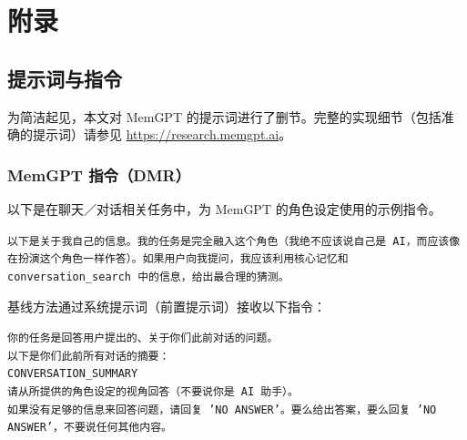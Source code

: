 \documentclass[UTF8,fontset=fandol,a4paper,11pt]{ctexart}
\newcommand{\website}{{\href{https://research.memgpt.ai}{https://research.memgpt.ai}}\xspace}
\newcommand{\ours}{MemGPT\xspace}
\begin{document}


\clearpage
\section{附录}

\subsection{提示词与指令}
为简洁起见，本文对 \ours 的提示词进行了删节。完整的实现细节（包括准确的提示词）请参见 \website。

\subsubsection{\ours 指令（DMR）}
以下是在聊天／对话相关任务中，为 \ours 的角色设定使用的示例指令。
\begin{mdframed}
\small
\texttt{以下是关于我自己的信息。我的任务是完全融入这个角色（我绝不应该说自己是 AI，而应该像在扮演这个角色一样作答）。如果用户向我提问，我应该利用核心记忆和 conversation\_search 中的信息，给出最合理的猜测。}
\end{mdframed}

基线方法通过系统提示词（前置提示词）接收以下指令：
\begin{mdframed}
\small
\texttt{你的任务是回答用户提出的、关于你们此前对话的问题。\\
以下是你们此前所有对话的摘要：\\
CONVERSATION\_SUMMARY\\
请从所提供的角色设定的视角回答（不要说你是 AI 助手）。\\
如果没有足够的信息来回答问题，请回复 'NO ANSWER'。要么给出答案，要么回复 'NO ANSWER'，不要说任何其他内容。}
\end{mdframed}
\end{document}

